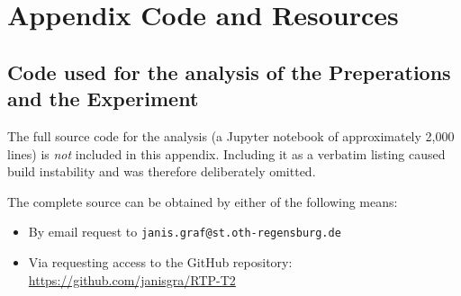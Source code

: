 \documentclass[12pt, oneside, a4paper]{scrreprt}
\begin{document}
                \vspace{12mm}

                \cleardoublepage

            \listoffigures



        \chapter{Appendix Code and Resources}

            \section{Code used for the analysis of the Preperations and the Experiment}


                \begin{tcolorbox}[
                    colback=red!10,
                    colframe=red!70!black,
                    title=\textbf{Editorial note — Source code omitted},
                    fonttitle=\bfseries,
                    sharp corners=south,
                ]
                    The full source code for the analysis (a Jupyter notebook of approximately 2{,}000 lines) is \emph{not} included in this appendix. Including it as a verbatim listing caused build instability and was therefore deliberately omitted.

                    The complete source can be obtained by either of the following means:
                    \begin{itemize}
                        \item By email request to \texttt{janis.graf@st.oth-regensburg.de}
                        \item Via requesting access to the GitHub repository: \url{https://github.com/janisgra/RTP-T2}
                    \end{itemize}
                \end{tcolorbox}

\end{document}
